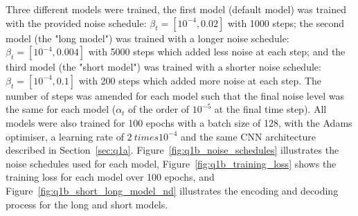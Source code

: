 Three different models were trained, the first model (default model) was trained with the provided noise schedule:
$\beta_{t} = [10^{-4}, 0.02]$ with 1000 steps; the second model (the "long model") was trained with a longer noise schedule:
$\beta_{t} = [10^{-4}, 0.004]$ with 5000 steps which added less noise at each step; and the third model (the "short model")
was trained with a shorter noise schedule: $\beta_{t} = [10^{-4}, 0.1]$ with 200 steps which added more noise at each step.
The number of steps was amended for each model such that the final noise level was the same for each model ($\alpha_{t}$
of the order of $10^{-5}$ at the final time step).
All models were also trained for 100 epochs with a batch size of 128, with the Adams optimiser, a learning rate of
$2 \ times 10^{-4}$ and the same CNN architecture described in Section~\eqref{sec:q1a}.
Figure~\eqref{fig:q1b_noise_schedules} illustrates the noise schedules used for each model, Figure~\eqref{fig:q1b_training_loss}
shows the training loss for each model over 100 epochs, and Figure~\eqref{fig:q1b_short_long_model_nd} illustrates the encoding
and decoding process for the long and short models.


